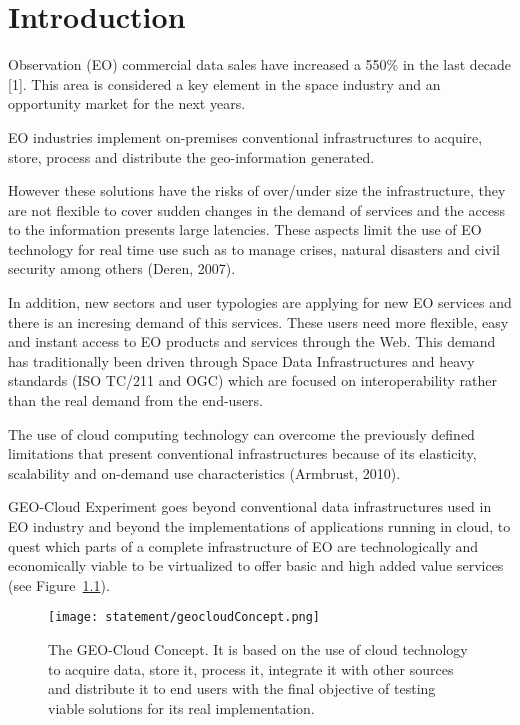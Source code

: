 \chapter{Introduction}

 Observation (EO) commercial data sales have increased a 550\% in
the last decade \cite{sousa}[1]. This area is considered a key element in the
space industry and an opportunity market for the next years.

\acs{EO} industries implement on-premises conventional infrastructures to acquire,
store, process and distribute the geo-information generated.

However these solutions have the risks of over/under size the infrastructure, they are not flexible to cover sudden changes in the demand of services and the access to the information presents large latencies.  These aspects limit the use of \acs{EO} technology for real time use such as to manage crises, natural disasters and civil security among others (Deren, 2007).

In addition, new sectors and user typologies are applying for new \acs{EO} services
and there is an incresing demand of this services. These users
need more flexible, easy and instant access to \acs{EO} products and services through
the Web. This demand has traditionally been driven through Space Data
Infrastructures and heavy standards (ISO TC/211 and OGC) which are focused on
interoperability rather than the real demand from the end-users.

The use of cloud computing technology can overcome the previously defined limitations that present conventional infrastructures because of its elasticity, scalability and on-demand use characteristics (Armbrust, 2010).

GEO-Cloud Experiment goes beyond conventional data infrastructures used in \acs{EO}
industry and beyond the implementations of applications running in cloud, to
quest which parts of a complete infrastructure of \acs{EO} are technologically and
economically viable to be virtualized to offer basic and high added value
services (see Figure~\ref{fig:intr-geocloudConcept}).

\begin{figure}[!h]
\begin{center}
\texttt{[image: statement/geocloudConcept.png]}
\caption{The GEO-Cloud Concept. It is based on the use of cloud technology to acquire data, store it, process it, integrate it with other sources and distribute it to end users with the final objective of testing viable solutions for its real implementation.}
\label{fig:intr-geocloudConcept}
\end{center}
\end{figure}

